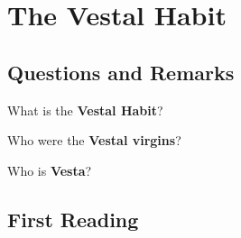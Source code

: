 %
%
%
\chapter{The Vestal Habit}
\label{VestHab} %








\abstract{}

\section{Questions and Remarks}
\label{sec:QR10}

\begin{qst}
    What is the \textbf{Vestal Habit}?
\end{qst}


\begin{qst}
    Who were the \textbf{Vestal virgins}?
\end{qst}


\begin{qst}
    Who is \textbf{Vesta}?
\end{qst}




\section{First Reading}
\label{sec:FirRead10}


